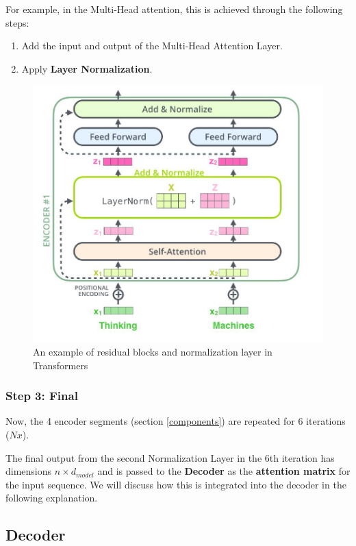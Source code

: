 For example, in the Multi-Head attention, this is achieved through the following steps:

\begin{enumerate}
\item Add the input and output of the Multi-Head Attention Layer.
\vspace{0.5 pt}
\item Apply \textbf{Layer Normalization}.
\end{enumerate}


\begin{figure}[H]
    \centering
    \includegraphics[width=0.75\linewidth]{tikz/Residula in Transformers.png}
    \caption{An example of residual blocks and normalization layer in Transformers}
    \label{fig:Residual-NormLayer}
\end{figure}



\subsubsection{Step 3: Final}

Now, the 4 encoder segments (section \ref{components}) are repeated for 6 iterations ($Nx$).

The final output from the second Normalization Layer in the 6th iteration has dimensions $n×d_{model}$ and is passed to the \textbf{Decoder} as the \textbf{attention matrix} for the input sequence. We will discuss how this is integrated into the decoder in the following explanation.

\subsection{Decoder}
    

